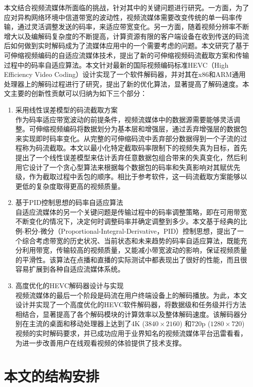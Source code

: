 本文结合视频流媒体所面临的挑战，针对其中的关键问题进行研究。一方面，为了应对异构网络环境中信道带宽的波动性，视频流媒体需要改变传统的单一码率传输，通过灵活调整发送的码率，来适应带宽变化。另一方面，随着视频分辨率不断增大以及编解码复杂度的不断提高，计算资源有限的客户端设备在收到传送的码流后如何做到实时解码成为了流媒体应用中的一个需要考虑的问题。本文研究了基于可伸缩视频编码的自适应流媒体技术，提出了新的可伸缩视频码流截取方案和传输过程中的码率自适应算法。本文针对最新的国际视频编码标准HEVC（High Efficiency Video Coding）\supercite{HEVC-Overview}设计实现了一个软件解码器，并对其在x86和ARM通用处理器上的解码过程进行了研究，提出了新的优化算法，显著提高了解码速度。本文主要的创新性贡献可以归纳为如下三个部分：
\begin{enumerate}
\item {采用线性误差模型的码流截取方案}\\
作为码率适应带宽波动的前提条件，视频流媒体中的数据源需要能够灵活调整。可伸缩视频编码将数据划分为基本层和增强层，通过丢弃增强层的数据包来实现即时码率变化。从完整的可伸缩码流中丢弃部分数据得到一个子流的过程称为码流截取。本文以最小化特定截取码率限制下的视频失真为目标，首先提出了一个线性误差模型来估计丢弃任意数据包组合带来的失真变化，然后利用它设计了一个贪心型算法来根据每个数据包的码率和失真影响对其赋优先级，作为截取过程中丢包的顺序。相比于参考软件，这一码流截取方案能够以更低的复杂度取得更高的视频质量。
\item {基于PID控制思想的码率自适应算法}\\
自适应流媒体的另一个关键问题是传输过程中的码率调整策略，即在可用带宽不断变化的情况下，决定何时调整码率并确定调整到多少。本文基于经典的比例-积分-微分（Proportional-Integral-Derivative，PID）控制思想，提出了一个综合考虑带宽的历史状况、当前状态和未来趋势的码率自适应算法，既能充分利用带宽，传输较高的视频质量，又能减小带宽波动的影响，保证视频质量的平滑性。该算法在点播和直播的实际测试中都表现出了很好的性能，而且很容易扩展到各种自适应流媒体系统。
\item {高度优化的HEVC解码器设计与实现}\\
视频流媒体的最后一个阶段是码流在用户终端设备上的解码播放。为此，本文设计并实现了一个高度优化的HEVC软件解码器，将数据级和任务级并行方法相结合，显著提高了各个解码模块的计算效率以及整体解码速度。该解码器分别在主流的桌面和移动处理器上达到了4K ($3840 \times 2160$) 和720p ($1280 \times 720$) 视频的实时解码要求，并已成功应用于业界知名的视频流媒体平台迅雷看看，为进一步改善用户在线观看视频的体验提供了技术支撑。
\end{enumerate}

\section{本文的结构安排}

